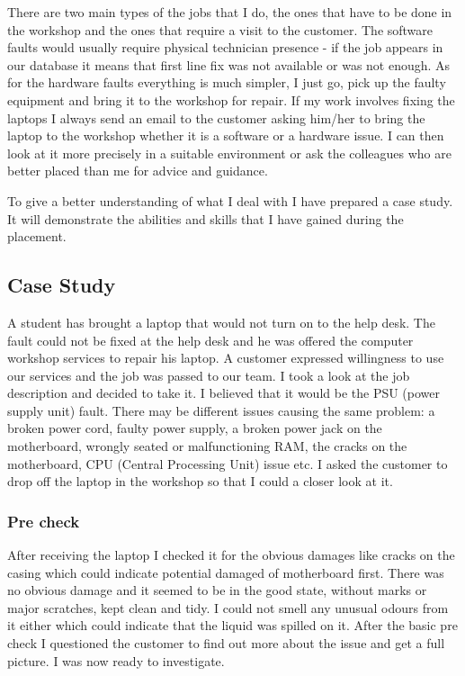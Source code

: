 \documentclass[10pt,a4paper,headinclude=true]{report}
\begin{document}
There are two main types of the jobs that I do, the ones that have to be done in the workshop and the ones that require a visit to the customer. The software faults would usually require physical technician presence - if the job appears in our database it means that first line fix was not available or was not enough. As for the hardware faults everything is much simpler, I just go, pick up the faulty equipment and bring it to the workshop for repair. If my work involves fixing the laptops I always send an email to the customer asking him/her to bring the laptop to the workshop whether it is a software or a hardware issue. I can then look at it more precisely in a suitable environment or ask the colleagues who are better placed than me for advice and guidance.

To give a better understanding of what I deal with I have prepared a case study. It will demonstrate the abilities and skills that I have gained during the placement. 

\subsection{Case Study}
A student has brought a laptop that would not turn on to the help desk. The fault could not be fixed at the help desk and he was offered the computer workshop services to repair his laptop. A customer expressed willingness to use our services and the job was passed to our team. I took a look at the job description and decided to take it. I believed that it would be the PSU (power supply unit) fault. There may be different issues causing the same problem: a broken power cord, faulty power supply, a broken power jack on the motherboard, wrongly seated or malfunctioning RAM, the cracks on the motherboard, CPU (Central Processing Unit) issue etc. I asked the customer to drop off the laptop in the workshop so that I could a closer look at it. 
\subsubsection{Pre check}
After receiving the laptop I checked it for the obvious damages like cracks on the casing which could indicate potential damaged of motherboard first. There was no obvious damage and it seemed to be in the good state, without marks or major scratches, kept clean and tidy. I could not smell any unusual odours from it either which could indicate that the liquid was spilled on it. After the basic pre check I questioned the customer to find out more about the issue and get a full picture. I was now ready to investigate.
\end{document}
